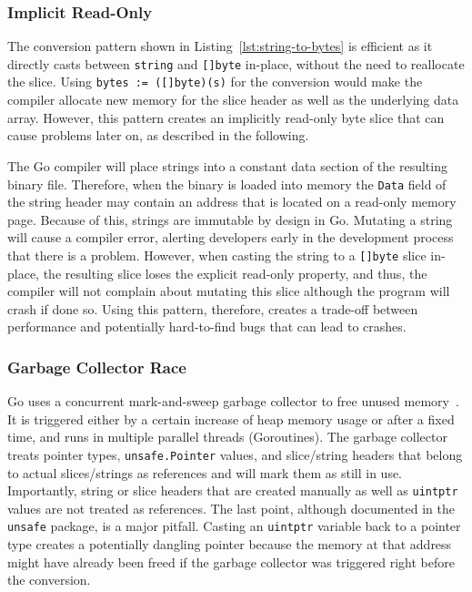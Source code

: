 \subsubsection*{Implicit Read-Only}

The conversion pattern shown in Listing~\ref{lst:string-to-bytes} is efficient as it directly casts between \texttt{string} and \texttt{[]byte} in-place, without the need to reallocate the slice.
Using \texttt{bytes := ([]byte)(s)} for the conversion would make the compiler allocate new memory for the slice header as well as the underlying data array.
However, this pattern creates an implicitly read-only byte slice that can cause problems later on, as described in the following.

The Go compiler will place strings into a constant data section of the resulting binary file.
Therefore, when the binary is loaded into memory the \texttt{Data} field of the string header may contain an address that is located on a read-only memory page.
Because of this, strings are immutable by design in Go.
Mutating a string will cause a compiler error, alerting developers early in the development process that there is a problem.
However, when casting the string to a \texttt{[]byte} slice in-place, the resulting slice loses the explicit read-only property, and thus, the compiler will not complain about mutating this slice although the program will crash if done so.
Using this pattern, therefore, creates a trade-off between performance and potentially hard-to-find bugs that can lead to crashes.


\subsubsection*{Garbage Collector Race}

Go uses a concurrent mark-and-sweep garbage collector to free unused memory~\cite{sibiryov2017}.
It is triggered either by a certain increase of heap memory usage or after a fixed time, and runs in multiple parallel threads (Goroutines).
The garbage collector treats pointer types, \texttt{unsafe.Pointer} values, and slice/string headers that belong to actual slices/strings as references and will mark them as still in use. %
Importantly, string or slice headers that are created manually as well as \texttt{uintptr} values are not treated as references.
The last point, although documented in the \texttt{unsafe} package, is a major pitfall.
Casting an \texttt{uintptr} variable back to a pointer type creates a potentially dangling pointer because the memory at that address might have already been freed if the garbage collector was triggered right before the conversion.

